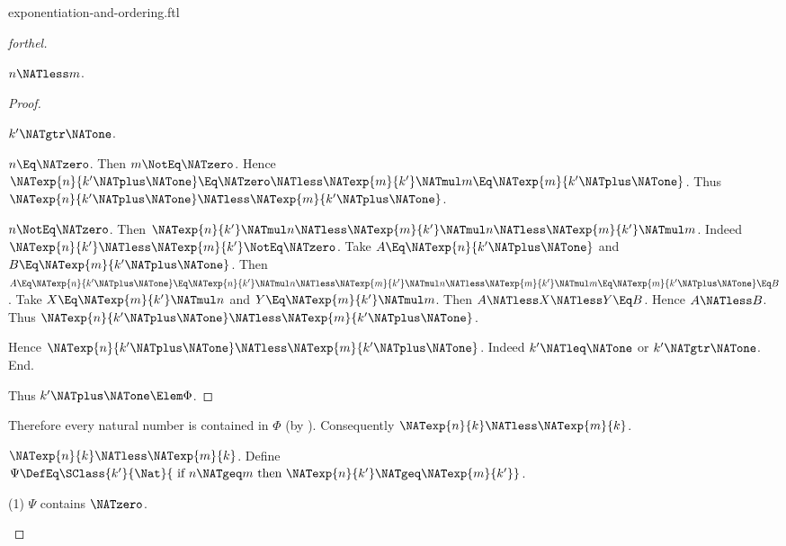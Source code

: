 \documentclass{stex}
\begin{document}
\begin{smodule}{exponentiation-and-ordering.ftl}
\begin{proof}[forthel]
\begin{case}{$n \NATless m$.}
\begin{proof}
        \begin{case}{$k' \NATgtr \NATone$.}
          \begin{case}{$n \Eq \NATzero$.}
            Then $m \NotEq \NATzero$.
            Hence $\NATexp{n}{k' \NATplus \NATone}
              \Eq \NATzero
              \NATless \NATexp{m}{k'} \NATmul m
              \Eq \NATexp{m}{k' \NATplus \NATone}$.
            Thus $\NATexp{n}{k' \NATplus \NATone} \NATless \NATexp{m}{k' \NATplus \NATone}$.
          \end{case}

          \begin{case}{$n \NotEq \NATzero$.}
            Then $\NATexp{n}{k'} \NATmul n
              \NATless \NATexp{m}{k'} \NATmul n
              \NATless \NATexp{m}{k'} \NATmul m$.
            Indeed $\NATexp{n}{k'} \NATless \NATexp{m}{k'} \NotEq \NATzero$.
            Take $A \Eq \NATexp{n}{k' \NATplus \NATone}$ and $B \Eq \NATexp{m}{k' \NATplus \NATone}$. %
            Then $A
              \Eq \NATexp{n}{k' \NATplus \NATone}
              \Eq \NATexp{n}{k'} \NATmul n
              \NATless \NATexp{m}{k'} \NATmul n
              \NATless \NATexp{m}{k'} \NATmul m
              \Eq \NATexp{m}{k' \NATplus \NATone}
              \Eq B$.
            Take $X \Eq \NATexp{m}{k'} \NATmul n$ and $Y \Eq \NATexp{m}{k'} \NATmul m$.
            Then $A \NATless X \NATless Y \Eq B$.
            Hence $A \NATless B$.
            Thus $\NATexp{n}{k' \NATplus \NATone} \NATless \NATexp{m}{k' \NATplus \NATone}$.
          \end{case}
        \end{case}

        Hence $\NATexp{n}{k' \NATplus \NATone} \NATless \NATexp{m}{k' \NATplus \NATone}$.
        Indeed $k' \NATleq \NATone$ or $k' \NATgtr \NATone$.
      End.

      Thus $k' \NATplus \NATone \Elem \Phi$.
    \end{proof}

    Therefore every natural number is contained in $\Phi$ (by ).
    Consequently $\NATexp{n}{k} \NATless \NATexp{m}{k}$.
  \end{case}

  \begin{case}{$\NATexp{n}{k} \NATless \NATexp{m}{k}$.}
    Define $\Psi \DefEq \SClass{k'}{\Nat}{\text{ if }n \NATgeq m\text{ then }\NATexp{n}{k'} \NATgeq \NATexp{m}{k'}}$.

    (1) $\Psi$ contains $\NATzero$.


\end{case}
\end{proof}
\end{smodule}
\end{document}
